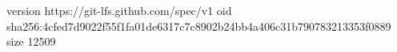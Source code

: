 version https://git-lfs.github.com/spec/v1
oid sha256:4cfed7d9022f55f1fa01de6317c7c8902b24bb4a406c31b790783213353f0889
size 12509
